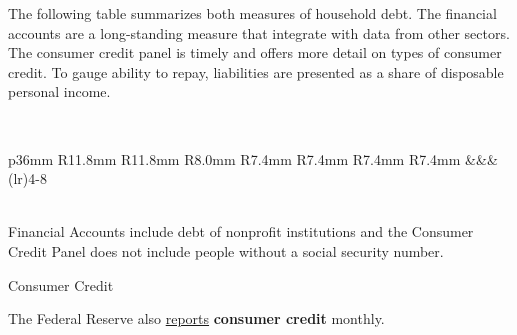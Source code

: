 \newpage
\begin{minipage}{0.76\textwidth}
\small The following table summarizes both measures of household debt. The financial accounts are a long-standing measure that integrate with data from other sectors. The consumer credit panel is timely and offers more detail on types of consumer credit. To gauge ability to repay, liabilities are presented as a share of disposable personal income. 
\vspace{1mm}

\vspace*{-9.5mm}

 \setlength{\tabcolsep}{4.2pt} \color{black!90}
	{\renewcommand{\arraystretch}{1.55}
		\ \begin{tabular}{p{36mm} R{11.8mm} R{11.8mm}  R{8.0mm} 
		R{7.4mm} R{7.4mm} R{7.4mm} R{7.4mm}}
		   	&&&  \\
		   	\addlinespace[-1mm]
		   		\cmidrule(lr){4-8}\addlinespace[-1mm]
			  \hline
		\end{tabular}
	}\vspace*{-1.5mm}

\\
\footnotesize{Financial Accounts include debt of nonprofit institutions and the Consumer Credit Panel does not include people without a social security number.}
\end{minipage}
\vspace{4.5mm}

\begin{minipage}{0.76\textwidth}  
\normalsize Consumer Credit 
\vspace*{-0.5mm}

\small The Federal Reserve also \href{https://www.federalreserve.gov/releases/g19/current/default.htm}{reports} \textbf{consumer credit} monthly. 



\\
\end{minipage}
\newpage

